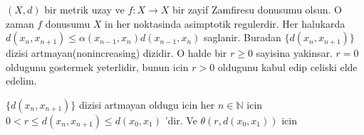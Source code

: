 \documentclass[10pt]{amsart}
\theoremstyle{plain}
\theoremstyle{definition}
\begin{document}
\proposition $(X, d)$ bir metrik uzay ve $f : X\rightarrow X$ bir zayif Zamfiresu donusumu olsun. O zaman $f$ donusumu $X$ in her noktasinda asimptotik regulerdir.
\kanit Her halukarda $d(x_n,x_{n+1})\leq \alpha(x_{n-1},x_n)d(x_{n-1},x_n)$ saglanir. Buradan $\{d(x_n,x_{n+1})\}$ dizisi artmayan(nonincreasing) dizidir. O halde bir $r\geq 0$ sayisina yakinsar. $r=0$ oldugunu gostermek yeterlidir, bunun icin $r>0$ oldugunu kabul edip celiski elde edelim.

$\{d(x_n,x_{n+1})\}$ dizisi artmayan oldugu icin her $n\in \mathbb{N}$ icin $0<r\leq d(x_n,x_{n+1})\leq d(x_0,x_1)$ 'dir. Ve $\theta(r,d(x_0,x_1))$ icin
\end{document}
